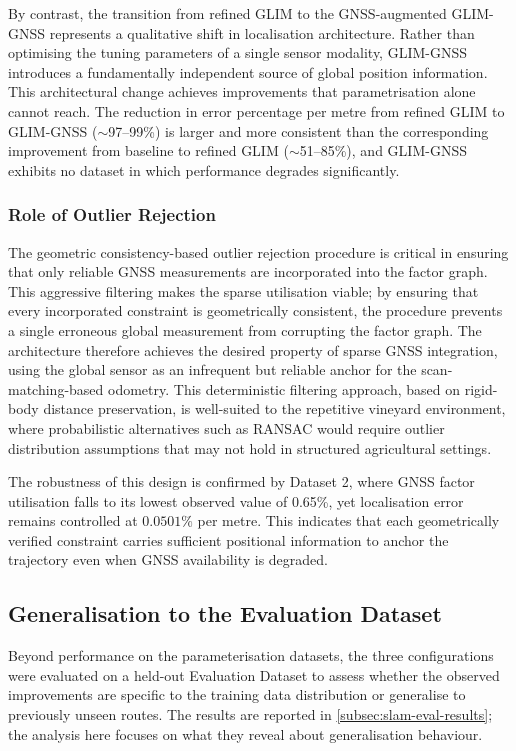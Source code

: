 By contrast, the transition from refined GLIM to the GNSS-augmented GLIM-GNSS represents a qualitative shift in localisation architecture. Rather than optimising the tuning parameters of a single sensor modality, GLIM-GNSS introduces a fundamentally independent source of global position information. This architectural change achieves improvements that parametrisation alone cannot reach. The reduction in error percentage per metre from refined GLIM to GLIM-GNSS ($\sim$97--99\%) is larger and more consistent than the corresponding improvement from baseline to refined GLIM ($\sim$51--85\%), and GLIM-GNSS exhibits no dataset in which performance degrades significantly.

\subsubsection{Role of Outlier Rejection}

The geometric consistency-based outlier rejection procedure is critical in ensuring that only reliable GNSS measurements are incorporated into the factor graph. This aggressive filtering makes the sparse utilisation viable; by ensuring that every incorporated constraint is geometrically consistent, the procedure prevents a single erroneous global measurement from corrupting the factor graph. The architecture therefore achieves the desired property of sparse GNSS integration, using the global sensor as an infrequent but reliable anchor for the scan-matching-based odometry. This deterministic filtering approach, based on rigid-body distance preservation, is well-suited to the repetitive vineyard environment, where probabilistic alternatives such as RANSAC would require outlier distribution assumptions that may not hold in structured agricultural settings.

The robustness of this design is confirmed by Dataset 2, where GNSS factor utilisation falls to its lowest observed value of 0.65\%, yet localisation error remains controlled at $0.0501\%$ per metre. This indicates that each geometrically verified constraint carries sufficient positional information to anchor the trajectory even when GNSS availability is degraded.

\subsection{Generalisation to the Evaluation Dataset}
\label{subsec:slam-generalisation}

Beyond performance on the parameterisation datasets, the three configurations were evaluated on a held-out Evaluation Dataset to assess whether the observed improvements are specific to the training data distribution or generalise to previously unseen routes. The results are reported in \cref{subsec:slam-eval-results}; the analysis here focuses on what they reveal about generalisation behaviour.


